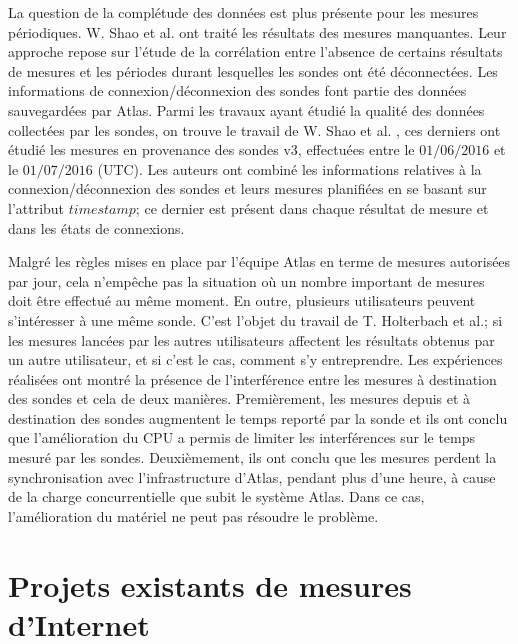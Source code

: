 La question de la complétude des données est plus présente pour les mesures périodiques. W. Shao et al.  \cite{DBLP:journals/corr/ShaoRDV17} ont traité les résultats des mesures manquantes.  Leur approche  repose sur l'étude de la corrélation entre  l'absence de certains résultats de mesures et les périodes durant lesquelles les sondes  ont été déconnectées. 
Les informations de connexion/déconnexion des sondes font partie des données sauvegardées par  Atlas. Parmi les travaux ayant étudié la qualité des données collectées par les sondes, on trouve le travail de W. Shao et al.  \cite{DBLP:journals/corr/ShaoRDV17},  ces derniers  ont étudié les mesures en provenance des  sondes v$3$, effectuées entre le $01/06/2016$ et  le $01/07/2016$ (UTC). Les auteurs ont combiné les informations relatives à la connexion/déconnexion des sondes et leurs mesures planifiées en se basant sur l'attribut $timestamp$; ce dernier est présent dans chaque résultat de mesure et dans les états de connexions.


Malgré les règles mises en place par l'équipe Atlas en terme de mesures autorisées par jour, cela n'empêche pas la situation où 
 un nombre important de mesures  doit être effectué au même moment. En outre, plusieurs  utilisateurs peuvent s'intéresser à une même sonde. C'est l'objet du  travail \cite{Holterbach:2015:QIM:2815675.2815710} de T. Holterbach et al.; si les mesures lancées par les autres utilisateurs affectent les résultats obtenus par un autre utilisateur, et si c'est le cas, comment s'y entreprendre. Les expériences réalisées ont montré la présence de l'interférence entre les mesures à destination des sondes et cela de deux manières. Premièrement, les mesures depuis et à destination des sondes augmentent le temps reporté par la sonde et ils ont conclu que l'amélioration du CPU a permis de limiter les interférences sur le temps mesuré par les sondes. Deuxièmement,  ils ont conclu que les mesures perdent la synchronisation avec l'infrastructure d'Atlas, pendant plus d'une heure, à cause de la charge concurrentielle que subit le système Atlas. Dans ce cas, l'amélioration du matériel ne peut pas résoudre le problème.



\section{Projets existants de mesures d'Internet}

